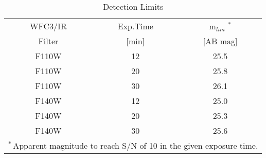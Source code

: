 




\begin{wraptable}{r}{2.25in}
 \caption{Detection Limits \label{tab:detectionLimits}}
 \begin{tabular}{ccc}
  \toprule
  \toprule
   WFC3/IR & Exp.Time & m$_{lim}$ $^{*}$ \\
   Filter  &  [min] &  [AB mag] \\
   \midrule
   F110W   &    12  &   25.5 \\
   F110W   &    20  &   25.8 \\
   F110W   &    30  &   26.1 \\
   F140W   &    12  &   25.0 \\
   F140W   &    20  &   25.3 \\ 
   F140W   &    30  &   25.6 \\
  \bottomrule
 \multicolumn{3}{p{2.6in}}{$^*$\,Apparent magnitude to reach S/N of 10 in the given exposure time.}
\end{tabular}
\end{wraptable}



